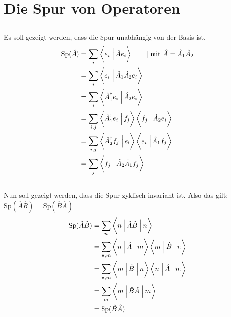 \section{}
\section{Die Spur von Operatoren}
\subsection{}
Es soll gezeigt werden, dass die Spur unabhängig von der Basis ist.
\begin{align*}
    \text{Sp}(\hat A) &= \sum_i \braket{e_i}{\hat Ae_i} \qquad|\text{ mit } \hat A=\hat A_1\hat A_2 \\
                      &= \sum_i \braket{e_i}{\hat A_1\hat A_2e_i} \\
                      &= \sum_i \braket{\hat A_1^\dagger e_i}{\hat A_2e_i} \\
                      &= \sum_{i,j} \braket{\hat A_1^\dagger e_i}{ f_j } \braket{f_j}{\hat A_2e_i} \\
                      &= \sum_{i,j}\braket{\hat A_2^\dagger f_j}{e_i} \braket{e_i}{\hat A_1f_j} \\
                      &= \sum_j \braket{f_j}{\hat A_2\hat A_1f_j} \\
\end{align*}

\subsection{}
Nun soll gezeigt werden, dass die Spur zyklisch invariant ist.
Also das gilt: $\text{Sp}(\hat A\hat B) = \text{Sp}(\hat B\hat A)$
\begin{align*}
    \text{Sp}(\hat A\hat B) &= \sum_n \braopket{n}{\hat A\hat B}{n} \\
                           &= \sum_{n,m} \braopket{n}{\hat A}{m} \braopket{m}{\hat B}{n} \\
                           &= \sum_{n,m} \braopket{m}{\hat B}{n}\braopket{n}{\hat A}{m} \\
                           &= \sum_m \braopket{m}{\hat B\hat A}{m} \\
                           &=\text{Sp}(\hat B\hat A)
\end{align*}


